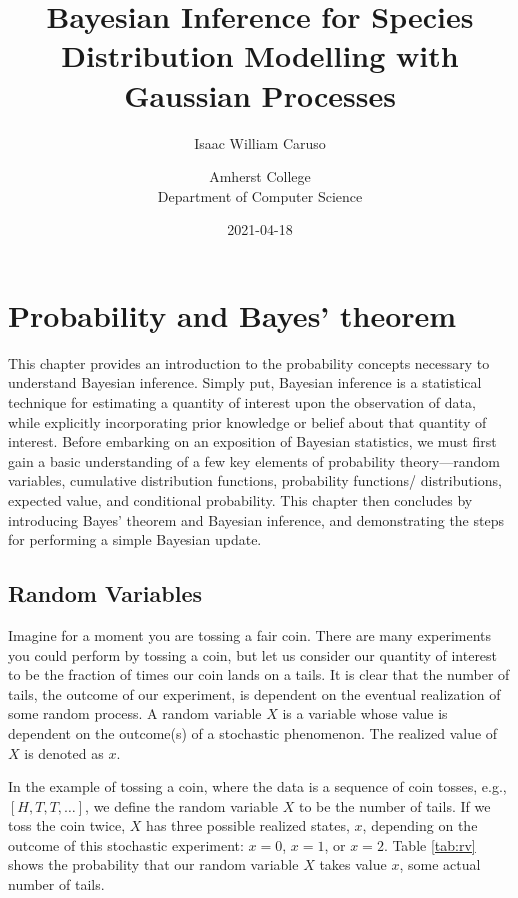 \documentclass[
  12pt,
]{book}
\title{Bayesian Inference for Species Distribution Modelling with Gaussian Processes}
\subtitle{Isaac William Caruso}
\author{Amherst College\\
Department of Computer Science}
\date{2021-04-18}
\theoremstyle{definition}
\theoremstyle{definition}
\theoremstyle{definition}
\theoremstyle{remark}
\begin{document}
\maketitle

{
\setcounter{tocdepth}{1}
\tableofcontents
}
\hypertarget{probability-and-bayes-theorem}{%
\chapter{Probability and Bayes' theorem}\label{probability-and-bayes-theorem}}

This chapter provides an introduction to the probability concepts necessary to understand Bayesian inference.
Simply put, Bayesian inference is a statistical technique for estimating a quantity of interest upon the observation of data, while explicitly incorporating prior knowledge or belief about that quantity of interest.
Before embarking on an exposition of Bayesian statistics, we must first gain a basic understanding of a few key elements of probability theory---random variables, cumulative distribution functions, probability functions/ distributions, expected value, and conditional probability.
This chapter then concludes by introducing Bayes' theorem and Bayesian inference, and demonstrating the steps for performing a simple Bayesian update.

\hypertarget{random-variables}{%
\section{Random Variables}\label{random-variables}}

Imagine for a moment you are tossing a fair coin.
There are many experiments you could perform by tossing a coin, but let us consider our quantity of interest to be the fraction of times our coin lands on a tails.
It is clear that the number of tails, the outcome of our experiment, is dependent on the eventual realization of some random process.
A random variable \(X\) is a variable whose value is dependent on the outcome(s) of a stochastic phenomenon.
The realized value of \(X\) is denoted as \(x\).

In the example of tossing a coin, where the data is a sequence of coin tosses, e.g., \([H, T, T, …]\), we define the random variable \(X\) to be the number of tails.
If we toss the coin twice, \(X\) has three possible realized states, \(x\), depending on the outcome of this stochastic experiment: \(x = 0\), \(x = 1\), or \(x = 2\).
Table \ref{tab:rv} shows the probability that our random variable \(X\) takes value \(x\), some actual number of tails.
\end{document}
